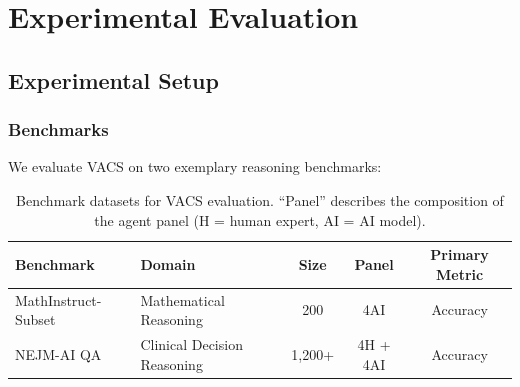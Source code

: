 \documentclass[12pt,a4paper]{article}
\newcommand{\calS}{\mathcal{S}}
\newcommand{\calA}{\mathcal{A}}
\begin{document}


\section{Experimental Evaluation}
\label{sec:experiments}

\subsection{Experimental Setup}

\subsubsection{Benchmarks}

We evaluate VACS on two exemplary reasoning benchmarks:



\begin{table}[htbp]
  \centering
  \caption{Benchmark datasets for VACS evaluation. ``Panel'' describes the composition
    of the agent panel (H = human expert, AI = AI model).}
  \label{tab:benchmarks}
  \begin{tabular}{llccc}
    \toprule
    \textbf{Benchmark} & \textbf{Domain} & \textbf{Size} & \textbf{Panel} &
    \textbf{Primary Metric} \\
    \midrule
    MathInstruct-Subset \citep{mathinstruct2024} & Mathematical Reasoning & 200 & 4AI & Accuracy \\
    NEJM-AI QA \citep{nejmai2025qa} & Clinical Decision Reasoning & 1,200+ & 4H + 4AI & Accuracy \\
    \bottomrule
  \end{tabular}
\end{table}
\end{document}
